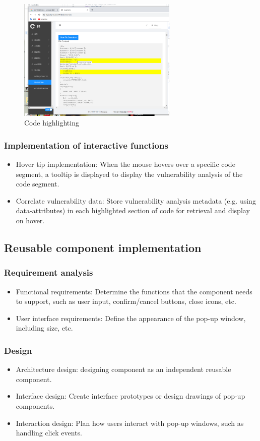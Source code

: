\documentclass[journal]{IEEEtran}
\begin{document}
\begin{figure}[h]
  \centering
  \includegraphics[width=3in]{figures/highlightcode.png}
  \caption{Code highlighting}
  \label{fig:highlightcode}
  \end{figure}

\subsubsection{Implementation of interactive functions}
\begin{itemize}
  \item Hover tip implementation: When the mouse hovers over a specific code segment, a tooltip is displayed to display the vulnerability analysis of the code segment.
  \item Correlate vulnerability data: Store vulnerability analysis metadata (e.g. using data-attributes) in each highlighted section of code for retrieval and display on hover.
\end{itemize}


\subsection{Reusable component implementation}
\subsubsection{Requirement analysis}
\begin{itemize}
  \item Functional requirements: Determine the functions that the component needs to support, such as user input, confirm/cancel buttons, close icons, etc.
  \item User interface requirements: Define the appearance of the pop-up window, including size, etc.
\end{itemize}

\subsubsection{Design}
\begin{itemize}
  \item Architecture design: designing component as an independent reusable component.
  \item Interface design: Create interface prototypes or design drawings of pop-up components.
  \item Interaction design: Plan how users interact with pop-up windows, such as handling click events.
\end{itemize}
\end{document}
